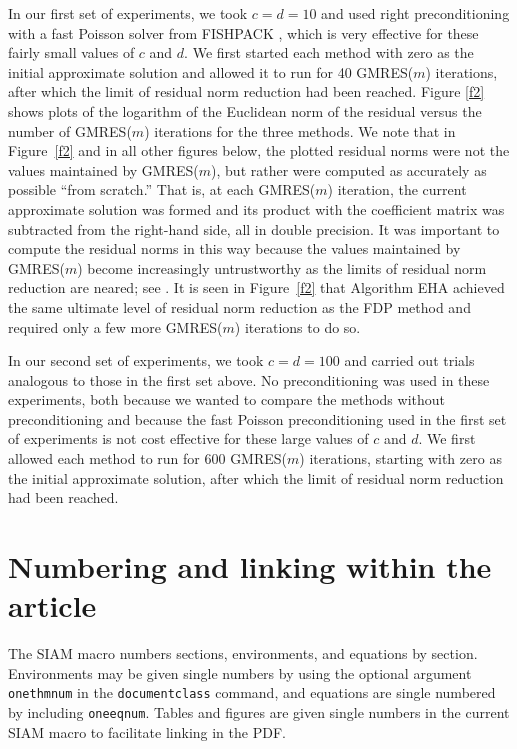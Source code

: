\documentclass[final,leqno,onetabnum]{siamltex0315}
\def\fishpack{{FISHPACK}}
\def\gmresm{{\rm GMRES($m$)}}
\begin{document}
In our first set of experiments, we took $c=d=10$ and used right 
preconditioning with a fast Poisson solver from {\fishpack}  
\cite{Swarztrauber-Sweet}, which is very effective for these  
fairly small values of $c$ and $d$. We first started each method 
with zero as the initial approximate solution and allowed it  
to run for 40 {\gmresm} iterations, after which the limit of residual  
norm reduction had been reached. Figure \ref{f2} shows plots  
of the logarithm of the Euclidean norm of the residual versus  
the number of {\gmresm} iterations for the three methods. We note
that in  Figure~\ref{f2} and in all other figures below, the plotted
residual norms were not the values maintained by {\gmresm}, but rather
were computed as accurately as possible ``from scratch.''  That is, 
at each {\gmresm} iteration, the current approximate solution was 
formed and its product with the coefficient matrix was subtracted 
from the right-hand side, all in double precision.  
It was important to compute the residual norms in this way because  
the values maintained by {\gmresm} become increasingly untrustworthy  
as the limits of residual norm reduction are neared; see \cite{Walker88}.  
It is seen in Figure~\ref{f2} that Algorithm EHA achieved  
the same ultimate level of residual norm reduction as the FDP  
method and required only a few more {\gmresm} iterations to do
so.  
 
In our second set of experiments, we took $c=d=100$ and carried out  
trials analogous to those in the first set above. No preconditioning  
was used in these experiments, both because we wanted to compare 
the methods without preconditioning and because the fast  
Poisson preconditioning used in the first set of experiments is 
not cost effective for these large values of $c$ and $d$. We first  
allowed each method to run for 600 {\gmresm} iterations, 
starting with zero as the initial approximate solution, after which  
the limit of residual norm reduction had been reached. 

\section{Numbering and linking within the article}
The SIAM macro numbers sections, environments, and equations by section.  Environments may be given single numbers 
by using the optional argument \texttt{onethmnum} in the \texttt{documentclass} command, and equations are single numbered
by including \texttt{oneeqnum}.  Tables and figures are given single numbers in the current SIAM macro to facilitate linking in the PDF.
\end{document}

